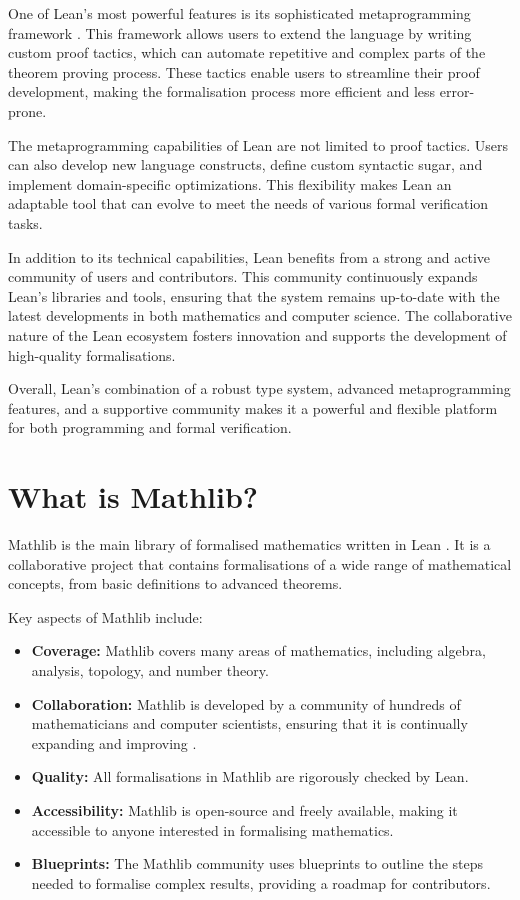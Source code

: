 One of Lean's most powerful features is its sophisticated metaprogramming framework \cite{Ebner2017}.
This framework allows users to extend the language by writing custom proof tactics, which can automate
repetitive and complex parts of the theorem proving process.
These tactics enable users to streamline their proof development, making the formalisation process
more efficient and less error-prone.

The metaprogramming capabilities of Lean are not limited to proof tactics.
Users can also develop new language constructs, define custom syntactic sugar,
and implement domain-specific optimizations. This flexibility makes Lean an adaptable tool that can
evolve to meet the needs of various formal verification tasks.

In addition to its technical capabilities, Lean benefits from a strong and active community of users and contributors.
This community continuously expands Lean's libraries and tools, ensuring that the system remains up-to-date with
the latest developments in both mathematics and computer science.
The collaborative nature of the Lean ecosystem fosters innovation and supports the development of
high-quality formalisations.

Overall, Lean's combination of a robust type system, advanced metaprogramming features, and a supportive
community makes it a powerful and flexible platform for both programming and formal verification.

\newpage
\section{What is Mathlib?}

Mathlib is the main library of formalised mathematics written in Lean \cite{Mathlib2020}.
It is a collaborative project that contains formalisations of a wide range of mathematical concepts,
from basic definitions to advanced theorems.

Key aspects of Mathlib include:
\begin{itemize}
    \item \textbf{Coverage:} Mathlib covers many areas of mathematics, including algebra, analysis, topology, and number theory.
    \item \textbf{Collaboration:} Mathlib is developed by a community of hundreds of mathematicians and computer scientists, ensuring that it is continually expanding and improving \cite{vanDoorn2020}.
    \item \textbf{Quality:} All formalisations in Mathlib are rigorously checked by Lean.
    \item \textbf{Accessibility:} Mathlib is open-source and freely available, making it accessible to anyone interested in formalising mathematics.
    \item \textbf{Blueprints:} The Mathlib community uses blueprints to outline the steps needed to formalise complex results, providing a roadmap for contributors.
\end{itemize}

